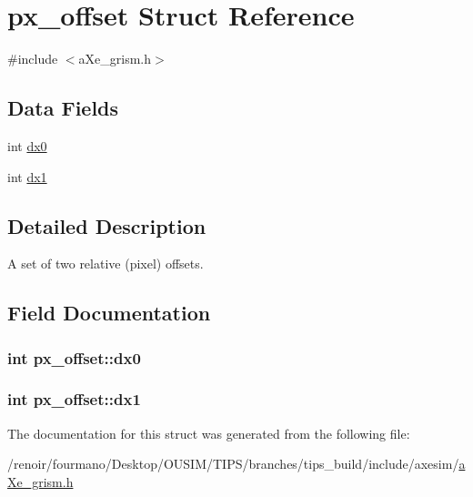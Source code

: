 \hypertarget{structpx__offset}{
\section{px\_\-offset Struct Reference}
\label{structpx__offset}
}


{\ttfamily \#include $<$aXe\_\-grism.h$>$}\subsection*{Data Fields}
\begin{DoxyCompactItemize}
\item 
int \hyperlink{structpx__offset_a5d141ef035baf4fefab88956ea1a7060}{dx0}
\item 
int \hyperlink{structpx__offset_a81678dca036abb27f0c829b3aabca784}{dx1}
\end{DoxyCompactItemize}


\subsection{Detailed Description}
A set of two relative (pixel) offsets. 

\subsection{Field Documentation}
\hypertarget{structpx__offset_a5d141ef035baf4fefab88956ea1a7060}{
\subsubsection[{dx0}]{\setlength{\rightskip}{0pt plus 5cm}int {\bf px\_\-offset::dx0}}}
\label{structpx__offset_a5d141ef035baf4fefab88956ea1a7060}
\hypertarget{structpx__offset_a81678dca036abb27f0c829b3aabca784}{
\subsubsection[{dx1}]{\setlength{\rightskip}{0pt plus 5cm}int {\bf px\_\-offset::dx1}}}
\label{structpx__offset_a81678dca036abb27f0c829b3aabca784}


The documentation for this struct was generated from the following file:\begin{DoxyCompactItemize}
\item 
/renoir/fourmano/Desktop/OUSIM/TIPS/branches/tips\_\-build/include/axesim/\hyperlink{aXe__grism_8h}{aXe\_\-grism.h}\end{DoxyCompactItemize}
